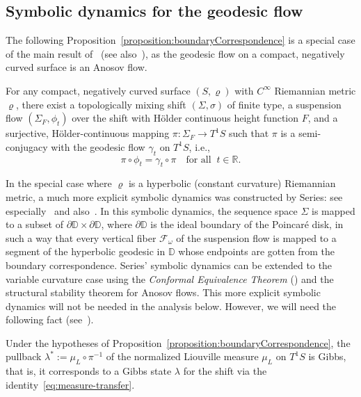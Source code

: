 \documentclass[10pt]{amsart}
\theoremstyle{definition}\newtheorem{defi}[theo]{Definition}\newtheorem{rema}[theo]{Remark}\newtheorem{exam}[theo]{Example}\newtheorem{exem}[theo]{Example}\newtheorem{nota}[theo]{Notation}
\newcommand{\zz}[1]{\mathbb #1}
\begin{document}
\subsection{Symbolic dynamics for the geodesic flow}\label{ssec:symbDynGF}

The following Proposition~\ref{proposition:boundaryCorrespondence} is a special case of the main result of~\cite{ratner:markov} (see also~\cite{bowen:symbDyn}), as the geodesic flow on a compact, negatively curved surface is an Anosov flow.

\begin{prop}\label{proposition:boundaryCorrespondence}
For any compact, negatively curved surface $(S, \varrho)$ with $C^{\infty}$ Riemannian metric $\varrho$, there exist a topologically mixing shift $(\Sigma,\sigma)$ of finite type, a suspension flow $(\Sigma_{F},\phi_{t})$ over the shift with H\"older continuous height function $F$, and a surjective, H\"older-continuous mapping $\pi:\Sigma_{F} \rightarrow T^1S$ such that $\pi$ is a semi-conjugacy with the geodesic flow $\gamma_{t}$ on $T^1S$, i.e.,
\begin{equation}\label{eq:semi-conjugacy}
\pi \circ \phi_{t}=\gamma_{t} \circ \pi \quad \text{for all}\;\;t\in \zz{R}.
\end{equation}
\end{prop}


In the special case where $\varrho$ is a hyperbolic (constant curvature) Riemannian metric, a much more explicit symbolic dynamics was constructed by Series: see especially~\cite[Theorem~3.1]{series:symbDynFlows} and also~\cite{bowen-series}. In this symbolic dynamics, the sequence space $\Sigma$ is mapped to a subset of $\partial \mathbb{D}\times \partial \mathbb{D}$, where $\partial \mathbb{D}$ is the ideal boundary of the Poincaré disk, in such a way that every vertical fiber $\mathcal{F}_{\omega}$ of the suspension flow is mapped to a segment of the hyperbolic geodesic in $\mathbb{D}$ whose endpoints are gotten from the boundary correspondence. Series' symbolic dynamics can be extended to the variable curvature case using the \emph{Conformal Equivalence Theorem} (\cite[Theorem~V.1.3]{schoen-yau}) and the structural stability theorem for Anosov flows. This more explicit symbolic dynamics will not be needed in the analysis below. However, we will need the following fact (see~\cite[Chapter~7]{paulin-pollicott-schapira}).

\begin{prop}\label{proposition:LiouvilleGibbs}
Under the hypotheses of Proposition~\ref{proposition:boundaryCorrespondence}, the pullback $\lambda^{*}:=\mu_{L}\circ \pi^{-1}$ of the normalized Liouville measure $\mu_{L}$ on $T^{1}S$ is Gibbs, that is, it corresponds to a Gibbs state $\lambda$ for the shift via the identity~\eqref{eq:measure-transfer}.
\end{prop}
\end{document}
